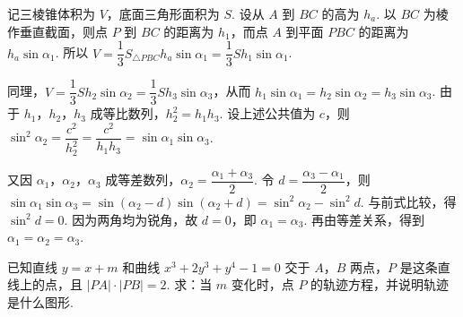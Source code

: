 \begin{solution}
记三棱锥体积为 \(V\)，底面三角形面积为 \(S\). 设从 \(A\) 到 \(BC\) 的高为 \(h_a\). 以 \(BC\) 为棱作垂直截面，则点 \(P\) 到 \(BC\) 的距离为 \(h_1\)，而点 \(A\) 到平面 \(PBC\) 的距离为 \(h_a\sin\alpha_1\). 所以
\(V=\dfrac13S_{\triangle PBC}h_a\sin\alpha_1=\dfrac13S h_1\sin\alpha_1\).

同理，\(V=\dfrac13S h_2\sin\alpha_2=\dfrac13S h_3\sin\alpha_3\)，从而
\(h_1\sin\alpha_1=h_2\sin\alpha_2=h_3\sin\alpha_3\). 由于 \(h_1\)，\(h_2\)，\(h_3\) 成等比数列，\(h_2^2=h_1h_3\). 设上述公共值为 \(c\)，则
\(\sin^2\alpha_2=\dfrac{c^2}{h_2^2}=\dfrac{c^2}{h_1h_3}=\sin\alpha_1\sin\alpha_3\).

又因 \(\alpha_1\)，\(\alpha_2\)，\(\alpha_3\) 成等差数列，\(\alpha_2=\dfrac{\alpha_1+\alpha_3}{2}\). 令 \(d=\dfrac{\alpha_3-\alpha_1}{2}\)，则
\(\sin\alpha_1\sin\alpha_3=\sin\left(\alpha_2-d\right)\sin\left(\alpha_2+d\right)=\sin^2\alpha_2-\sin^2d\). 与前式比较，得 \(\sin^2d=0\). 因为两角均为锐角，故 \(d=0\)，即 \(\alpha_1=\alpha_3\). 再由等差关系，得到 \(\alpha_1=\alpha_2=\alpha_3\).
\end{solution}

\begin{problem}

已知直线 \(y=x+m\) 和曲线 \(x^3+2y^3+y^4-1=0\) 交于 \(A\)，\(B\) 两点，\(P\) 是这条直线上的点，且 \(\left|PA\right|\cdot\left|PB\right|=2\). 求：当 \(m\) 变化时，点 \(P\) 的轨迹方程，并说明轨迹是什么图形.
\end{problem}

